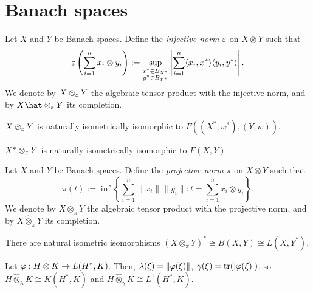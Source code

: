 \documentclass{../../large}
\begin{document}
\begin{prb}

\end{prb}



\section{Banach spaces}

\begin{prb}

\end{prb}

\begin{prb}
Let $X$ and $Y$ be Banach spaces.
Define the \emph{injective norm} $\varepsilon$ on $X\otimes Y$ such that
\[\varepsilon\left(\sum_{i=1}^nx_i\otimes y_i\right):=\sup_{\substack{x^*\in B_{X^*}\\y^*\in B_{Y^*}}}\left|\sum_{i=1}^n\langle x_i,x^*\rangle\langle y_i,y^*\rangle\right|.\]
We denote by $X\otimes_\varepsilon Y$ the algebraic tensor product with the injective norm, and by $X\hat\otimes_\e Y$ its completion.
\begin{parts}
\item $X\otimes_\varepsilon Y$ is naturally isometrically isomorphic to $F((X^*,w^*),(Y,w))$.
\item $X^*\otimes_\varepsilon Y$ is naturally isometrically isomorphic to $F(X,Y)$.
\end{parts}
\end{prb}

\begin{prb}
Let $X$ and $Y$ be Banach spaces.
Define the \emph{projective norm} $\pi$ on $X\otimes Y$ such that
\[\pi\left(t\right):=\inf\left\{\sum_{i=1}^n\|x_i\|\|y_i\|:t=\sum_{i=1}^nx_i\otimes y_i\right\}.\]
We denote by $X\otimes_\pi Y$ the algebraic tensor product with the projective norm, and by $X\hat\otimes_\pi Y$ its completion.
\begin{parts}
\item There are natural isometric isomorphisms $(X\otimes_\pi Y)^*\cong B(X,Y)\cong L(X,Y^*)$.
\item
\end{parts}
\end{prb}

\begin{prb}

Let $\varphi:H\otimes K\to L(H^*,K)$.
Then, $\lambda(\xi)=\|\varphi(\xi)\|$, $\gamma(\xi)=\operatorname{tr}(|\varphi(\xi)|)$, so $H\hat\otimes_\lambda K\cong K(H^*,K)$ and $H\hat\otimes_\gamma K\cong L^1(H^*,K)$.
\end{prb}
\end{document}
